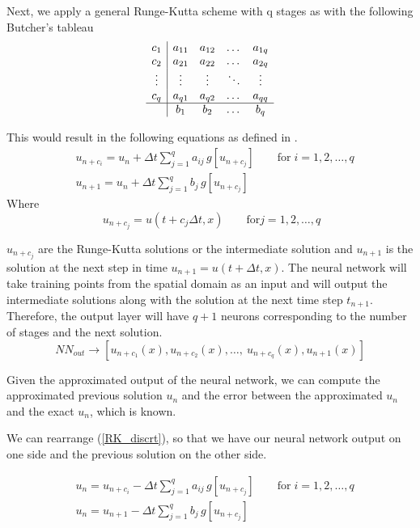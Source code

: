\documentclass[a4paper,12pt]{article}
\theoremstyle{definition}
\begin{document}
Next, we apply a general Runge-Kutta scheme with q stages as with the following Butcher's tableau 
$$
\begin{array}{c|cccc}
c_1 & a_{11} & a_{12} & \dots & a_{1q} \\ 
c_2 & a_{21} & a_{22} & \dots & a_{2q} \\ 
\vdots & \vdots & \vdots & \ddots & \vdots \\ 
c_q & a_{q1} & a_{q2} & \dots & a_{qq} \\ 
\hline
& b_1 & b_2 & \dots & b_q
\end{array}
$$

This would result in the following equations as defined in \cite{iserles2009first}.
\begin{equation}\label{RK_discrt}
\begin{aligned}
& u_{n+c_i} = u_n + \Delta t \sum_{j=1}^{q} a_{ij} \, g[u_{n+c_j}] \qquad \text{for} \; i = 1, 2, \dots, q \\
& u_{n+1} = u_n + \Delta t \sum_{j=1}^{q} b_j \, g[u_{n+c_j}] 
\end{aligned}
\end{equation}
Where 
$$\: u_{n+c_j} = u(t+c_j \Delta t, x) \qquad \text{for} j = 1, 2, \dots, q$$ 

$u_{n + c_j}$ are the Runge-Kutta solutions or the intermediate solution and 
$u_{n+1}$ is the solution at the next step in time $u_{n+1} = u(t + \Delta t, x)$.
The neural network will take training points from the spatial domain as an input 
and will output the intermediate solutions along with the solution at the next time step $t_{n+1}$.
Therefore, the output layer will have $q+1$ neurons corresponding to the number of stages and the next 
solution. 
\begin{equation}\label{NN_RK_output}
NN_{out} \rightarrow [u_{n+c_1}(x), u_{n+c_2}(x), \dots, \ u_{n+c_q}(x), u_{n+1}(x)]
\end{equation}

Given the approximated output of the neural network, we can compute the ap\-prox\-i\-mat\-ed previous solution 
$u_{n}$ and the error between the approximated $u_n$ and the exact $u_n$, which is known.

We can rearrange (\ref{RK_discrt}), so that we have our neural network output on one side and the 
previous solution on the other side.

\begin{equation}\label{RK_discrt_rearranged}
\begin{aligned}
& u_n = u_{n+c_i} -  \Delta t \sum_{j=1}^{q} a_{ij} \, g[u_{n+c_j}] 
\qquad \text{for} \; i = 1, 2, \dots, q \\
& u_n = u_{n+1} - \Delta t \sum_{j=1}^{q} b_j \, g[u_{n+c_j}] 
\end{aligned}
\end{equation}
\end{document}
